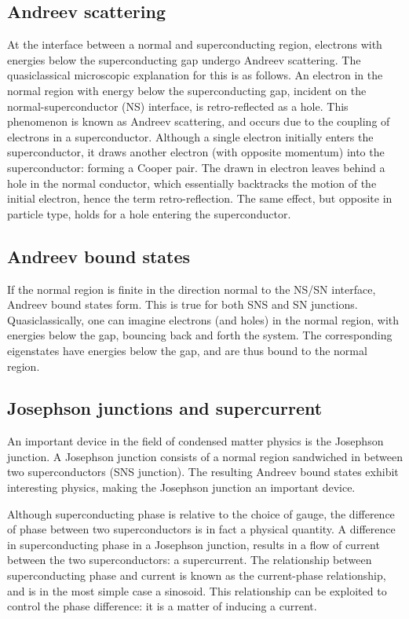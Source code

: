 	\subsection{Andreev scattering}
		At the interface between a normal and superconducting region, electrons with energies below the superconducting gap undergo Andreev scattering.
		The quasiclassical microscopic explanation for this is as follows.
		An electron in the normal region with energy below the superconducting gap, incident on the normal-superconductor (NS) interface, is retro-reflected as a hole.
		This phenomenon is known as Andreev scattering, and occurs due to the coupling of electrons in a superconductor.
		Although a single electron initially enters the superconductor, it draws another electron (with opposite momentum) into the superconductor: forming a Cooper pair.
		The drawn in electron leaves behind a hole in the normal conductor, which essentially backtracks the motion of the initial electron, hence the term retro-reflection.
		The same effect, but opposite in particle type, holds for a hole entering the superconductor.

	\subsection{Andreev bound states}
		If the normal region is finite in the direction normal to the NS/SN interface, Andreev bound states form.
		This is true for both SNS and SN junctions.
		Quasiclassically, one can imagine electrons (and holes) in the normal region, with energies below the gap, bouncing back and forth the system.
		The corresponding eigenstates have energies below the gap, and are thus bound to the normal region.

	\subsection{Josephson junctions and supercurrent}
		An important device in the field of condensed matter physics is the Josephson junction.
		A Josephson junction consists of a normal region sandwiched in between two superconductors (SNS junction).
		The resulting Andreev bound states exhibit interesting physics, making the Josephson junction an important device.

		Although superconducting phase is relative to the choice of gauge, the difference of phase between two superconductors is in fact a physical quantity.
		A difference in superconducting phase in a Josephson junction, results in a flow of current between the two superconductors: a supercurrent.
		The relationship between superconducting phase and current is known as the current-phase relationship, and is in the most simple case a sinosoid.
		This relationship can be exploited to control the phase difference: it is a matter of inducing a current.

